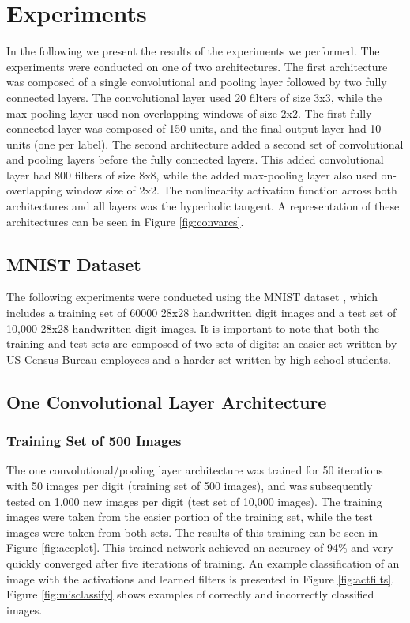 \documentclass[10pt,twocolumn,letterpaper]{article}
\begin{document}
\section{Experiments}

In the following we present the results of the experiments we performed. The experiments were conducted
on one of two architectures. The first architecture was composed of a single convolutional and pooling
layer followed by two fully connected layers. The convolutional layer used 20 filters of size 3x3,
while the max-pooling layer used non-overlapping windows of size 2x2. The first fully connected layer
was composed of 150 units, and the final output layer had 10 units (one per label). The second
architecture added a second set of convolutional and pooling layers before the fully connected layers.
This added convolutional layer had 800 filters of size 8x8, while the added max-pooling layer also used
on-overlapping window size of 2x2. The nonlinearity activation function across both architectures and
all layers was the hyperbolic tangent. A representation of these architectures can be seen in Figure
\ref{fig:convarcs}.

\subsection{MNIST Dataset}

The following experiments were conducted using the MNIST dataset \cite{MNIST}, which includes a training set of
60000 28x28 handwritten digit images and a test set of 10,000 28x28 handwritten digit images.
It is important to note that both the training and test sets are composed of two sets of digits:
an easier set written by US Census Bureau employees and a harder set written by high school students.

\subsection{One Convolutional Layer Architecture}

\subsubsection{Training Set of 500 Images}

The one convolutional/pooling layer architecture was trained for 50 iterations with 50 images per digit
(training set of 500 images), and was subsequently tested on
1,000 new images per digit (test set of 10,000 images).
The training images were taken from the easier portion of the training set, while the test images were taken from
both sets. The results of this training can be seen in Figure \ref{fig:accplot}. This trained network achieved an
accuracy of 94\% and very quickly converged after five iterations of training. An example
classification of an image with the activations and learned filters is presented
in Figure \ref{fig:actfilts}. Figure \ref{fig:misclassify} shows examples of correctly and incorrectly classified images.
\end{document}
